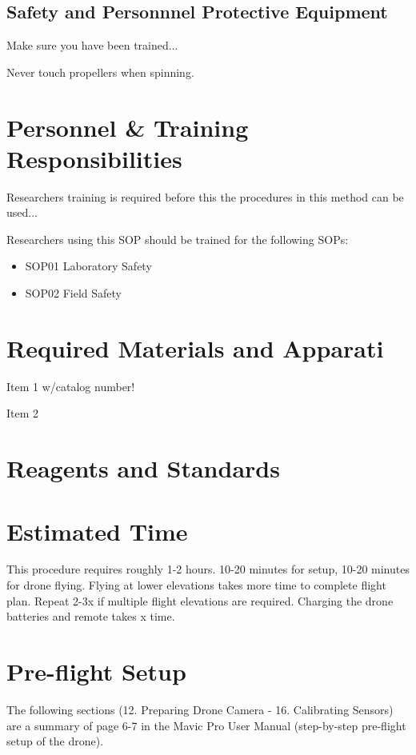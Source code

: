\documentclass[12pt]{../SOP4_alpha}\usepackage[]{graphicx}\usepackage[]{color}
\begin{document}
\subsection{Safety and Personnnel Protective Equipment}

\NP Make sure you have been trained... 

\NP Never touch propellers when spinning. 

\section{Personnel \& Training Responsibilities}

\NP Researchers training is required before this the procedures in this method can be used... 

\NP Researchers using this SOP should be trained for the following SOPs:

\begin{itemize}
  \item SOP01 Laboratory Safety
  \item SOP02 Field Safety
\end{itemize}

\section{Required Materials and Apparati}

\NP Item 1 w/catalog number!

\NP Item 2

\section{Reagents and Standards}

\section{Estimated Time}

\NP This procedure requires roughly 1-2 hours. 10-20 minutes for setup, 10-20 minutes for drone flying. Flying at lower elevations takes more time to complete flight plan. Repeat 2-3x if multiple flight elevations are required. Charging the drone batteries and remote takes x time. 

\section{Pre-flight Setup}
\NP The following sections (12. Preparing Drone Camera - 16. Calibrating Sensors) are a summary of page 6-7 in the Mavic Pro User Manual (step-by-step pre-flight setup of the drone). 
\end{document}
